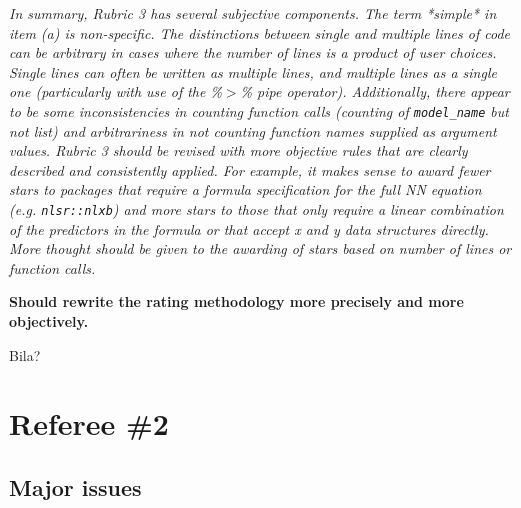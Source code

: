 \documentclass[12pt]{article}
\newcommand{\code}{\texttt}
\newcommand{\red}[1]{{\color{red}#1}}
\begin{document}
\begin{enumerate}
\textit{
In summary, Rubric 3 has several subjective components.  The term *simple* in item (a) is non-specific.  
The distinctions between single and multiple lines of code can be arbitrary in cases where the number of lines is a product of user choices.  
Single lines can often be written as multiple lines, and multiple lines as a single one (particularly with use of the \%$>$\% pipe operator).  
Additionally, there appear to be some inconsistencies in counting function calls (counting of \code{model\_name}  but not list) 
and arbitrariness in not counting function names supplied as argument values. 
Rubric 3 should be revised with more objective rules that are clearly described and consistently applied.  
For example, it makes sense to award fewer stars to packages that require a formula specification for the full NN equation 
(e.g. \code{nlsr::nlxb}) and more stars to those that only require a linear combination of the predictors in the formula or that 
accept x and y data structures directly.  
More thought should be given to the awarding of stars based on number of lines or function calls.
}

\textbf{Should rewrite the rating methodology more precisely and more objectively.}

\red{Bila?}


\end{enumerate}

\newpage
\section{Referee \#2}\label{referee2}

\subsection*{Major issues}
\end{document}
